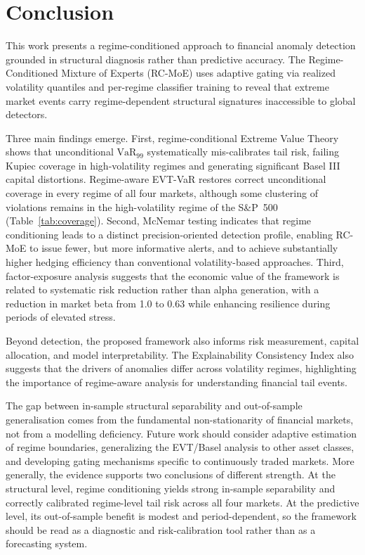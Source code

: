 \documentclass[]{interact}
\begin{document}
\section{Conclusion}
\label{sec:conclusion}
This work presents a regime-conditioned approach to financial anomaly detection grounded in structural diagnosis rather than predictive accuracy. The Regime-Conditioned Mixture of Experts (RC-MoE) uses adaptive gating via realized volatility quantiles and per-regime classifier training to reveal that extreme market events carry regime-dependent structural signatures inaccessible to global detectors.

Three main findings emerge. First, regime-conditional Extreme Value Theory shows that unconditional $\text{VaR}_{99}$ systematically mis-calibrates tail risk, failing Kupiec coverage in high-volatility regimes and generating significant Basel III capital distortions. Regime-aware EVT-VaR restores correct unconditional coverage in every regime of all four markets, although some clustering of violations remains in the high-volatility regime of the S\&P~500 (Table~\ref{tab:coverage}). Second, McNemar testing indicates that regime conditioning leads to a distinct precision-oriented detection profile, enabling RC-MoE to issue fewer, but more informative alerts, and to achieve substantially higher hedging efficiency than conventional volatility-based approaches. Third, factor-exposure analysis suggests that the economic value of the framework is related to systematic risk reduction rather than alpha generation, with a reduction in market beta from 1.0 to 0.63 while enhancing resilience during periods of elevated stress.

Beyond detection, the proposed framework also informs risk measurement, capital allocation, and model interpretability. The Explainability Consistency Index also suggests that the drivers of anomalies differ across volatility regimes, highlighting the importance of regime-aware analysis for understanding financial tail events.

The gap between in-sample structural separability and out-of-sample generalisation comes from the fundamental non-stationarity of financial markets, not from a modelling deficiency. Future work should consider adaptive estimation of regime boundaries, generalizing the EVT/Basel analysis to other asset classes, and developing gating mechanisms specific to continuously traded markets. More generally, the evidence supports two conclusions of different strength. At the structural level, regime conditioning yields strong in-sample separability and correctly calibrated regime-level tail risk across all four markets. At the predictive level, its out-of-sample benefit is modest and period-dependent, so the framework should be read as a diagnostic and risk-calibration tool rather than as a forecasting system.
\end{document}
